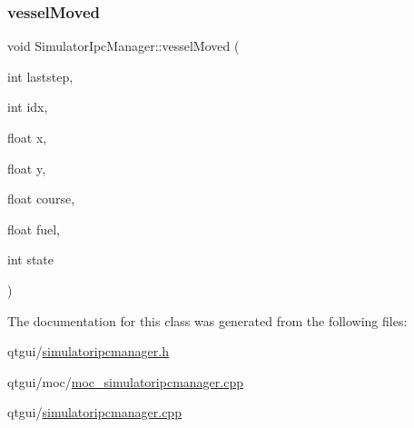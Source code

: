 \mbox{\label{class_simulator_ipc_manager_a1cb0cc4a00ce9b3db4ddfc218e78486a}} 
\subsubsection{\texorpdfstring{vesselMoved}{vesselMoved}}
{\footnotesize\ttfamily void Simulator\+Ipc\+Manager\+::vessel\+Moved (\begin{DoxyParamCaption}\item[{int}]{laststep,  }\item[{int}]{idx,  }\item[{float}]{x,  }\item[{float}]{y,  }\item[{float}]{course,  }\item[{float}]{fuel,  }\item[{int}]{state }\end{DoxyParamCaption})\hspace{0.3cm}{\ttfamily [signal]}}



The documentation for this class was generated from the following files\+:\begin{DoxyCompactItemize}
\item 
qtgui/\mbox{\hyperlink{simulatoripcmanager_8h}{simulatoripcmanager.\+h}}\item 
qtgui/moc/\mbox{\hyperlink{moc__simulatoripcmanager_8cpp}{moc\+\_\+simulatoripcmanager.\+cpp}}\item 
qtgui/\mbox{\hyperlink{simulatoripcmanager_8cpp}{simulatoripcmanager.\+cpp}}\end{DoxyCompactItemize}
